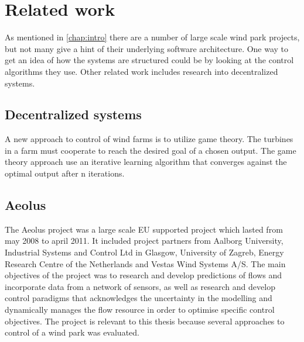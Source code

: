 \chapter{Related work}
As mentioned in \cref{chap:intro} there are a number of large scale wind park projects, but not many give a hint of their underlying software architecture.
One way to get an idea of how the systems are structured could be by looking at the control algorithms they use.
Other related work includes research into decentralized systems.


\section{Decentralized systems}


A new approach to control of wind farms is to utilize game theory\cite{AModelFreeApproachToWindFarmControl}.
The turbines in a farm must cooperate to reach the desired goal of a chosen output.
The game theory approach use an iterative learning algorithm that converges against the optimal output after n iterations.

\section{Aeolus}
The Aeolus project was a large scale EU supported project which lasted from may 2008 to april 2011. It included project partners from 
Aalborg University, Industrial Systems and Control Ltd in Glasgow, University of Zagreb, Energy Research Centre of the Netherlands and Vestas Wind Systems A/S.
The main objectives of the project was to research and develop predictions of flows and incorporate data from a network of sensors, as well as research and develop control paradigms that acknowledges the uncertainty in the modelling and dynamically manages the flow resource in order to optimise specific control objectives.
The project is relevant to this thesis because several approaches to control of a wind park was evaluated.


